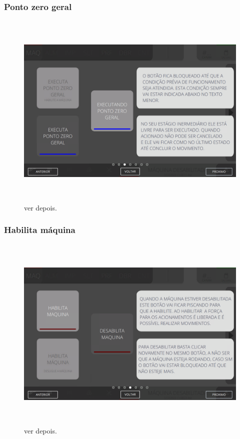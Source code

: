 \vspace*{\fill}

\newpage
\thispagestyle{fancy}

\vspace*{\fill}

\subsubsection{\small{Ponto zero geral}}

\begin{figure}[h]
  \centering
  \includegraphics[width=576px,height=360px]{src/imagesFlexo/02-machine/e-3.png}
  \caption{ver depois.}
   \label{}
\end{figure}

\vspace*{\fill}

\newpage
\thispagestyle{fancy}

\vspace*{\fill}

\subsubsection{\small{Habilita máquina}}

\begin{figure}[h]
  \centering
  \includegraphics[width=576px,height=360px]{src/imagesFlexo/02-machine/e-4.png}
  \caption{ver depois.}
   \label{}
\end{figure}

